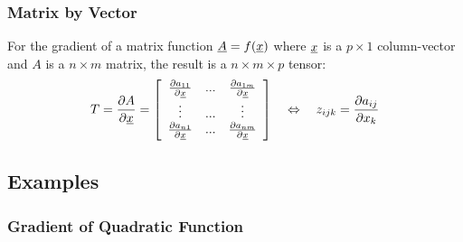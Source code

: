 
\subsubsection{Matrix by Vector}

For the gradient of a matrix function $\underline{A} = f(\underline{x})$ where $\underline{x}$ is a $p \times 1$ column-vector and $A$ is a $n \times m$ matrix, the result is a $n \times m \times p$ tensor:
\begin{align}
T = \frac{\partial A}{\partial \underline{x}} =  
\left[ \begin{array}{c c c } 
  \frac{\partial a_{11}}{\partial \underline{x}}   & ... & \frac{\partial a_{1m}}{\partial \underline{x}} \\
  \vdots                             & ... & \vdots                          \\
  \frac{\partial a_{n1}}{\partial \underline{x}}   & ... & \frac{\partial a_{nm}}{\partial \underline{x}} \\
 \end{array} \right]
 \quad\Leftrightarrow\quad
  z_{ijk} = \frac{\partial a_{ij}}{\partial x_k}
\end{align}








\newpage

\subsection{Examples}

\subsubsection{Gradient of Quadratic Function}

